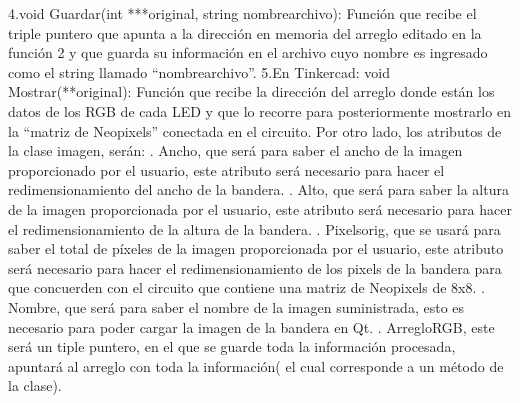 \documentclass{article}
\begin{document}
\newline
4.void Guardar(int ***original, string nombrearchivo): Función que recibe el triple puntero que apunta a la dirección en memoria del arreglo editado en la función 2 y que guarda su información en el archivo cuyo nombre es ingresado como el string llamado “nombrearchivo”.
\newline
5.En Tinkercad: void Mostrar(**original): Función que recibe la dirección del arreglo donde están los datos de los RGB de cada LED y que lo recorre para posteriormente mostrarlo en la “matriz de Neopixels” conectada en el circuito.
\newline
\newline
Por otro lado, los atributos de la clase imagen, serán: 
. Ancho, que será para saber el ancho de la imagen proporcionado por el usuario, este atributo será necesario para hacer el redimensionamiento del ancho de la bandera.
. Alto, que será para saber la altura de la imagen proporcionada por el usuario, este atributo será necesario para hacer el redimensionamiento de la altura  de la bandera.
. Pixelsorig, que se usará para saber el total de píxeles de la imagen proporcionada por el usuario, este atributo será necesario para hacer el redimensionamiento de los pixels de la bandera para que concuerden con el circuito que contiene una matriz de Neopixels de 8x8.
. Nombre, que será para saber el nombre de la imagen suministrada, esto es necesario para poder cargar la imagen de la bandera en Qt. 
. ArregloRGB, este será un tiple puntero, en el que se guarde toda la información procesada, apuntará al arreglo con toda la información( el cual corresponde a un método de la clase). 

\newpage
\end{document}
